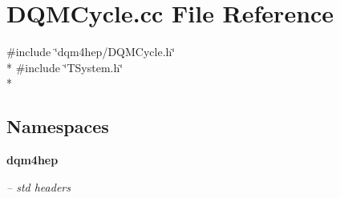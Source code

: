 \section{D\+Q\+M\+Cycle.\+cc File Reference}
\label{DQMCycle_8cc}
{\ttfamily \#include \char`\"{}dqm4hep/\+D\+Q\+M\+Cycle.\+h\char`\"{}}\\*
{\ttfamily \#include \char`\"{}T\+System.\+h\char`\"{}}\\*
\subsection*{Namespaces}
\begin{DoxyCompactItemize}
\item 
 {\bf dqm4hep}
\begin{DoxyCompactList}\small\item\em -- std headers \end{DoxyCompactList}\end{DoxyCompactItemize}
